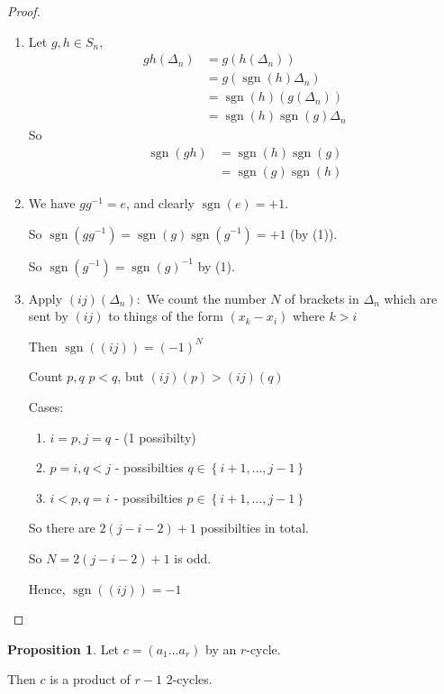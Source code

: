 \documentclass{article}
\theoremstyle{definition}
\newtheorem{proposition}[theorem]{Proposition}
\newcommand{\dtn}{\Delta_n}
\DeclareMathOperator{\sgn}{sgn}
\begin{document}
\begin{proof}
  \begin{enumerate}
    \item Let $g,h \in S_n$,
      \begin{align*}
        gh(\dtn) &= g(h(\dtn)) \\
                 &= g(\sgn(h)\dtn) \\
                 &= \sgn(h)(g(\dtn)) \\
                 &= \sgn(h) \sgn(g) \dtn
      \end{align*}
      So 
      \begin{align*}
        \sgn(gh) &= \sgn(h)\sgn(g) \\
                 &= \sgn(g)\sgn(h)
      \end{align*}

    \item We have $g g^{-1}=e$, and clearly $\sgn(e) = +1$. 

      So $\sgn(g g^{-1})=\sgn(g)\sgn(g^{-1})=+1$ (by (1)).

      So $\sgn(g^{-1})=\sgn(g)^{-1}$ by (1).

    \item Apply $(ij)(\dtn):$
      We count the number $N$ of brackets in $\dtn$ which are sent by $(ij)$ to things of the form $(x_k - x_i)$ where $k>i$ 

      Then $\sgn\left( (ij) \right)=(-1)^N$

      Count $p,q$ $p<q$, but $(ij)(p)>(ij)(q)$

      Cases: 
      \begin{enumerate}
        \item $i=p, j=q$ - (1 possibilty)
        \item $p=i,q<j$ - possibilties $q \in \left\{ i+1, \ldots, j-1 \right\}$
        \item $i<p,q=i$ - possibilties $p \in \left\{ i+1, \ldots , j-1 \right\}$
      \end{enumerate}
      So there are $2(j-i-2) +1$ possibilties in total.

      So $N=2(j-i-2)+1$ is odd. 

      Hence, $\sgn\left( (ij) \right)=-1$
  \end{enumerate}
\end{proof}

\begin{proposition}
  \label{prp:rcycle}
  Let $c=(a_1 \ldots a_r)$ by an $r$-cycle. 

  Then $c$ is a product of $r-1$ 2-cycles.
\end{proposition}
\end{document}
